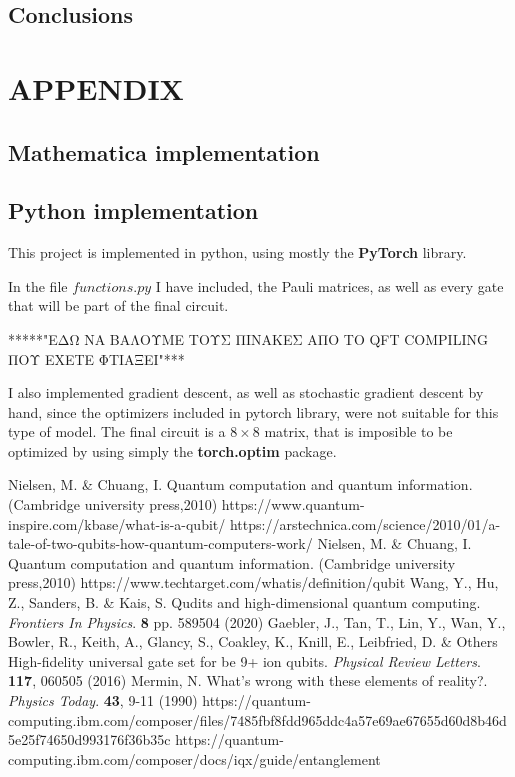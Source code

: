 \documentclass[inscr,ack,preface]{diphdthesis}
\begin{document}
\section{Conclusions}


\chapter{APPENDIX}
\section{Mathematica implementation}
\section{Python implementation}

This project is implemented in python, using mostly the \textbf{PyTorch} library. 

In the file $functions.py$ I have included, the Pauli matrices, as well as every gate that will be part of the final circuit. 


*****"ΕΔΩ ΝΑ ΒΑΛΟΥΜΕ ΤΟΥΣ ΠΙΝΑΚΕΣ ΑΠΟ ΤΟ QFT COMPILING ΠΟΥ ΕΧΕΤΕ ΦΤΙΑΞΕΙ"***

I also implemented gradient descent, as well as stochastic gradient descent by hand, since the optimizers included in pytorch library, were not suitable for this type of model. The final circuit is a $8\times8$ matrix, that is imposible to be optimized by using simply the \textbf{torch.optim} package.





\begin{thebibliography}{99}                                                                     
Nielsen, M. \& Chuang, I. Quantum computation and quantum information. (Cambridge university press,2010)
https://www.quantum-inspire.com/kbase/what-is-a-qubit/
https://arstechnica.com/science/2010/01/a-tale-of-two-qubits-how-quantum-computers-work/
Nielsen, M. \& Chuang, I. Quantum computation and quantum information. (Cambridge university press,2010)
https://www.techtarget.com/whatis/definition/qubit
Wang, Y., Hu, Z., Sanders, B. \& Kais, S. Qudits and high-dimensional quantum computing. {\em Frontiers In Physics}. \textbf{8} pp. 589504 (2020)
Gaebler, J., Tan, T., Lin, Y., Wan, Y., Bowler, R., Keith, A., Glancy, S., Coakley, K., Knill, E., Leibfried, D. \& Others High-fidelity universal gate set for be 9+ ion qubits. {\em Physical Review Letters}. \textbf{117}, 060505 (2016)
Mermin, N. What's wrong with these elements of reality?. {\em Physics Today}. \textbf{43}, 9-11 (1990)
https://quantum-computing.ibm.com/composer/files/7485fbf8fdd965ddc4a57e69ae67655d60d8b46d5e25f74650d993176f36b35c
https://quantum-computing.ibm.com/composer/docs/iqx/guide/entanglement


\end{thebibliography}
\end{document}
